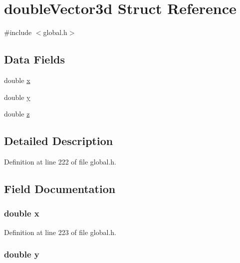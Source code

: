 \hypertarget{structdoubleVector3d}{\section{double\-Vector3d Struct Reference}
\label{structdoubleVector3d}
}


{\ttfamily \#include $<$global.\-h$>$}

\subsection*{Data Fields}
\begin{DoxyCompactItemize}
\item 
double \hyperlink{structdoubleVector3d_af88b946fb90d5f08b5fb740c70e98c10}{x}
\item 
double \hyperlink{structdoubleVector3d_ab927965981178aa1fba979a37168db2a}{y}
\item 
double \hyperlink{structdoubleVector3d_ab3e6ed577a7c669c19de1f9c1b46c872}{z}
\end{DoxyCompactItemize}


\subsection{Detailed Description}


Definition at line 222 of file global.\-h.



\subsection{Field Documentation}
\hypertarget{structdoubleVector3d_af88b946fb90d5f08b5fb740c70e98c10}{
\subsubsection[{x}]{\setlength{\rightskip}{0pt plus 5cm}double x}}\label{structdoubleVector3d_af88b946fb90d5f08b5fb740c70e98c10}


Definition at line 223 of file global.\-h.

\hypertarget{structdoubleVector3d_ab927965981178aa1fba979a37168db2a}{
\subsubsection[{y}]{\setlength{\rightskip}{0pt plus 5cm}double y}}\label{structdoubleVector3d_ab927965981178aa1fba979a37168db2a}


